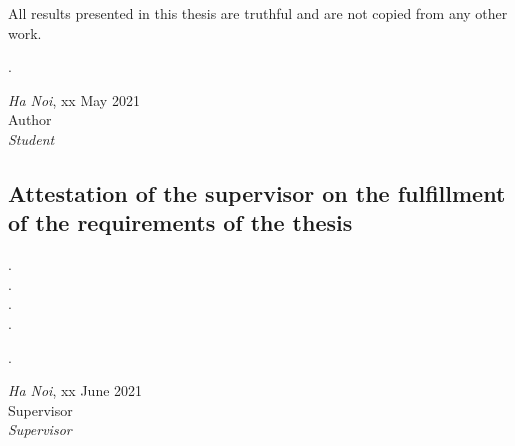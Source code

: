 All results presented in this thesis are truthful and are not copied from any other work.
\begin{minipage}{0.5\textwidth}
.
\end{minipage}
\begin{minipage}[t]{0.5\textwidth}



\begin{center}
  \textit{Ha Noi}, xx May 2021\\
  Author\\[3cm]
  
  \textit{Student}
\end{center}
\end{minipage}
\subsection*{Attestation of the supervisor on the fulfillment of the requirements of the thesis}
.\dotfill \\
.\dotfill \\ 
.\dotfill \\ 
.\dotfill \\
\begin{minipage}{0.5\textwidth}
.
\end{minipage}
\begin{minipage}[t]{0.5\textwidth}

\begin{center}
  \textit{Ha Noi}, xx June 2021\\
  Supervisor\\[3cm]
  
  \textit{Supervisor}
\end{center}
\end{minipage}

\pagebreak
